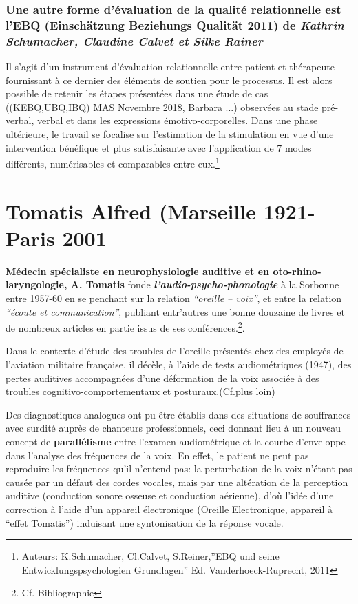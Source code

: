 \subsection{Une autre forme d'évaluation de la qualité
  relationnelle est l'EBQ (Einschätzung Beziehungs Qualität 2011) de
  \textit{Kathrin Schumacher, Claudine Calvet et Silke Rainer}}
Il s'agit d'un instrument d'évaluation relationnelle entre patient et
thérapeute fournissant à ce dernier des éléments de soutien pour le
processus. Il est alors possible de retenir les étapes présentées dans une étude de cas
((KEBQ,UBQ,IBQ) MAS Novembre 2018,
Barbara ...) observées au stade pré-verbal, verbal et dans les expressions
émotivo-corporelles.
Dans une phase ultérieure, le travail se focalise sur l'estimation de
la stimulation en vue d'une intervention bénéfique et plus
satisfaisante avec l'application de 7 modes différents, numérisables
et comparables entre eux.\footnote{ Auteurs: K.Schumacher,
  Cl.Calvet, S.Reiner,''EBQ und seine Entwicklungspsychologien Grundlagen'' Ed. Vanderhoeck-Ruprecht, 2011 } 




 \chapter{Tomatis Alfred (Marseille 1921-Paris 2001}   

\textbf{
Médecin spécialiste en neurophysiologie auditive et en
oto-rhino-laryngologie, A. Tomatis} fonde
\textit{\textbf{l'audio-psycho-phonologie }} à la Sorbonne entre 
1957-60 en  se penchant sur la relation 
\textit{``oreille -- voix''}, et entre la relation \textit{``écoute
et communication''}, publiant entr'autres une bonne douzaine de livres et de nombreux
articles en partie issus de ses
conférences.\footnote{Cf. Bibliographie}.

Dans le contexte d'étude des troubles de
l'oreille présentés chez des employés de l'aviation militaire
française, il décèle, à l'aide
de tests audiométriques
 (1947), des pertes auditives accompagnées d'une
déformation de la voix associée à des troubles
cognitivo-comportementaux et posturaux.(Cf.plus loin)

Des diagnostiques analogues ont pu être établis dans des situations
de souffrances avec surdité auprès de chanteurs professionnels,
ceci donnant lieu
à un nouveau concept de
\textbf{parallélisme } entre l'examen audiométrique et la courbe
d'enveloppe dans l'analyse des fréquences de la voix.
En effet, le patient ne peut pas reproduire les fréquences qu'il
n'entend pas: 
la perturbation de la voix n'étant pas causée par un défaut des cordes
vocales, mais par une altération de la perception auditive (conduction
sonore osseuse et conduction aérienne), d'où
l'idée d'une correction à l'aide d'un appareil électronique (Oreille
Electronique, appareil à ``effet Tomatis'') induisant
une syntonisation de la réponse vocale.

